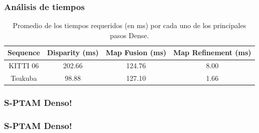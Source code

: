 \documentclass[compress]{beamer}
\begin{document}
%

\begin{frame}
	\frametitle{Análisis de tiempos}
	\begin{table}[!htb]
		\centering
		\small
		\begin{tabular}{cccc}
			\toprule
			Sequence & Disparity (ms) & Map Fusion (ms) & Map Refinement (ms) \\
			\midrule
			KITTI 06 & 202.66 & 124.76 & 8.00 \\
			Tsukuba & 98.88 & 127.10 & 1.66 \\
			\bottomrule
		\end{tabular}
		\caption{Promedio de los tiempos requeridos (en ms) por cada uno de los principales pasos Dense.}
		\label{table:table_times}
	\end{table}
\end{frame}

\begin{frame}
	\frametitle{S-PTAM Denso!}
	\centering
	
\end{frame}

\begin{frame}
	\frametitle{S-PTAM Denso!}
	\centering
	
\end{frame}
\end{document}
